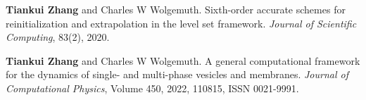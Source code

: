 
\begin{cventries}
  \cventry
    {} %
    {} %
    {} %
    {} %
    {
      \begin{cvitems} %
        \item {\textbf{Tiankui Zhang} and Charles W Wolgemuth. Sixth-order accurate schemes for reinitialization
and extrapolation in the level set framework. \textit{Journal of Scientific Computing}, 83(2), 2020.}
      \end{cvitems}
    }

  \cventry
    {} %
    {} %
    {} %
    {} %
    {
      \begin{cvitems} %
      	\item {\textbf{Tiankui Zhang} and Charles W Wolgemuth. A general computational framework for the dynamics of single- and multi-phase vesicles and membranes.  \textit{Journal of Computational Physics}, Volume 450, 2022, 110815, ISSN 0021-9991.}
      \end{cvitems}
    }
\end{cventries}